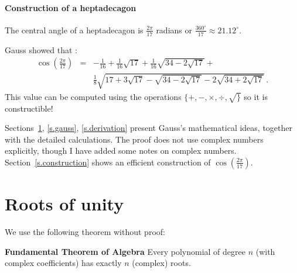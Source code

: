\documentclass[11pt,a4paper]{article}
\newenvironment{form}[1]{%
\begin{displaymath}%
\renewcommand{\arraystretch}{#1}%
\begin{array}{lcl}}%
{\end{array}%
\end{displaymath}%
}
\newcommand*{\disfrac}[2]{\displaystyle\frac{#1}{#2}}
\newcommand*{\sm}[1]{$\scriptstyle #1$}
\begin{document}
\paragraph{Construction of a heptadecagon}
The central angle of a heptadecagon is $\disfrac{2\pi}{17}$ radians or $\disfrac{360^\circ}{17}\approx 21.12^\circ$. 
\begin{center}
\end{center}
Gauss showed that \cite{jorg,gauss}:
\begin{form}{3}
\cos\left(\disfrac{2\pi}{17}\right) &=& 
-\disfrac{1}{16}+\disfrac{1}{16}\sqrt{17} + 
     \disfrac{1}{16}\sqrt{34-2\sqrt{17}}
    + \\
    &&
     \disfrac{1}{8}\sqrt{
     17+3\sqrt{17} - 
     \sqrt{34-2\sqrt{17}}
   -2
     \sqrt{34+2\sqrt{17}}
   }\,.
\end{form}
This value can be computed using the operations $\{+,-,\times,\div,\surd\}$ so it is constructible!

Sections~\ref{s.roots}, \ref{s.gauss}, \ref{s.derivation} present Gauss's mathematical ideas, together with the detailed calculations. The proof does not use complex numbers explicitly, though I have added some notes on complex numbers. Section~\ref{s.construction} shows an efficient construction of $\cos\left(\disfrac{2\pi}{17}\right)$.

\section{Roots of unity}\label{s.roots}

We use the following theorem without proof:

\textbf{Fundamental Theorem of Algebra} Every polynomial of degree $n$ (with complex coefficients) has exactly $n$ (complex) roots.
\end{document}
